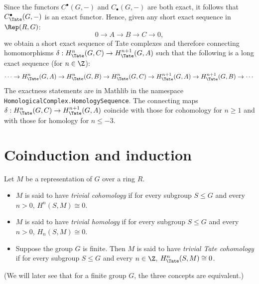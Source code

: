 \begin{definition}	\label{def:Tate long exact sequence}
	\leanok
	\mathlibok
  Since the functors $C^\bullet(G,-)$ and $C_\bullet(G,-)$ are both exact, it follows
	that $C^\bullet_{\Tate}(G,-)$ is an exact functor.
	Hence, given any short exact sequence in $\Rep(R,G)$:
	\[
		0 \to A \to B \to C \to 0,
	\]
	we obtain a short exact sequence of Tate complexes and therefore
	connecting homomorphisms $\delta : H^n_{\Tate}(G,C) \to H^{n+1}_{\Tate}(G,A)$
	such that the following is a long exact sequence (for $n \in \Z$):
	\[
		\cdots \to H^n_{\Tate}(G,A) \to H^n_{\Tate}(G,B) \to H^n_{\Tate}(G,C)
		\to H^{n+1}_{\Tate}(G,A) \to H^{n+1}_{\Tate}(G,B) \to \cdots
	\]
	The exactness statements are in Mathlib in the namespace
	\texttt{HomologicalComplex.HomologySequence}.
	The connecting maps $\delta : H^n_{\Tate}(G,C) \to H^{n+1}_{\Tate}(G,A)$
	coincide with those for cohomology for $n \ge 1$ and with those for homology for $n \le -3$.
\end{definition}





\section{Coinduction and induction}


\begin{definition} \label{def:trivial cohomology}
	\leanok
	Let $M$ be a representation of $G$ over a ring $R$.
	\begin{itemize}
		\item
		$M$ is said to have \emph{trivial cohomology} if for every subgroup $S \le G$
		and every $n > 0$, $H^n(S,M) \cong 0$.
		\item
		$M$ is said to have \emph{trivial homology} if for every subgroup $S \le G$
		and every $n > 0$, $H_n(S,M) \cong 0$.
		\item
		Suppose the group $G$ is finite. Then $M$ is said to have \emph{trivial Tate cohomology}
		if for every subgroup $S \le G$
		and every $n \in \Z$, $H^n_{\Tate}(S,M) \cong 0$.
	\end{itemize}
	(We will later see that for a finite group $G$, the three concepts are equivalent.)
\end{definition}

